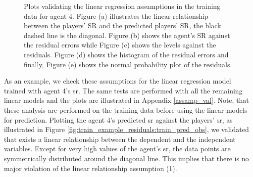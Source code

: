 \begin{figure}[ht!]
    \caption{Plots validating the linear regression assumptions in the training data for agent 4. Figure (a) illustrates the linear relationship between the players' SR and the predicted players' SR, the black dashed line is the diagonal. Figure (b) shows the agent's SR against the residual errors while Figure (c) shows the levels against the residuals. Figure (d) shows the histogram of the residual errors and finally, Figure (e) shows the normal probability plot of the residuals.}
    \label{fig:train_example_residuals}
\end{figure}
\noindent
As an example, we check these assumptions for the linear regression model trained with agent 4's \acs{sr}. The same tests are performed with all the remaining linear models and the plots are illustrated in Appendix \ref{assamp_val}. Note, that these analysis are performed on the training data before using the linear models for prediction.
Plotting the agent 4's predicted \acs{sr} against the players' \acs{sr}, as illustrated in Figure \ref{fig:train_example_residuals:train_pred_obs}, we validated that exists a linear relationship between the dependent and the independent variables. Except for very high values of the agent's \acs{sr}, the data points are symmetrically distributed around the diagonal line. This implies that there is no major violation of the linear relationship assumption (1). 
